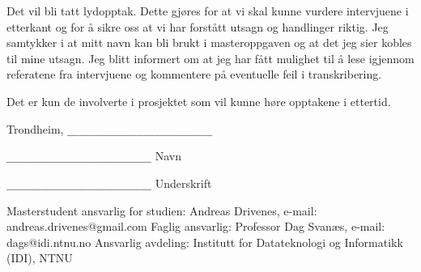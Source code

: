Det vil bli tatt lydopptak.  Dette gjøres for at vi skal kunne vurdere intervjuene i etterkant og for å sikre oss at vi har
forstått utsagn og handlinger riktig. Jeg samtykker i at mitt navn kan bli brukt i masteroppgaven og at det jeg sier kobles
til mine utsagn. Jeg blitt informert om at jeg har fått mulighet til å lese igjennom referatene fra intervjuene og
kommentere på eventuelle feil i transkribering. 

Det er kun de involverte i prosjektet som vil kunne høre opptakene i ettertid.

Trondheim, \verb|_________________________|

\verb|_________________________|\newline
Navn

\verb|_________________________|\newline
Underskrift \newline

Masterstudent ansvarlig for studien: \newline
	Andreas Drivenes, e-mail: andreas.drivenes@gmail.com \newline
Faglig ansvarlig: \newline
	Professor Dag Svanæs, e-mail: dags@idi.ntnu.no \newline
Ansvarlig avdeling: \newline
	Institutt for Datateknologi og Informatikk (IDI), NTNU
